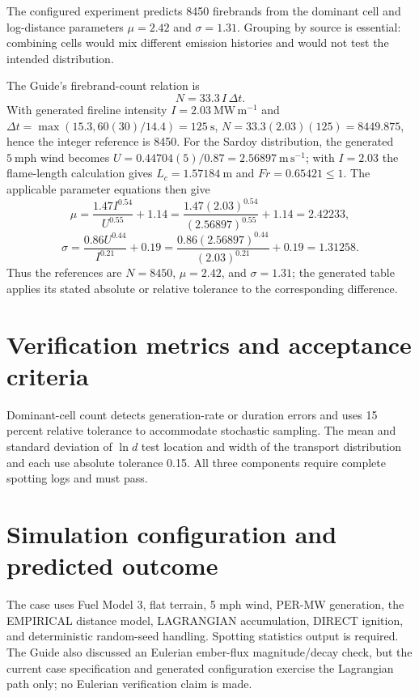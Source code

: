 The configured experiment predicts 8450 firebrands from the dominant cell and log-distance parameters \(\mu=2.42\) and \(\sigma=1.31\). Grouping by source is essential: combining cells would mix different emission histories and would not test the intended distribution.

The Guide's firebrand-count relation is
\[
 N=33.3\,I\,\Delta t.
\]
With generated fireline intensity \(I=2.03~\mathrm{MW\,m^{-1}}\) and
\(\Delta t=\max(15.3,60(30)/14.4)=125~\mathrm{s}\),
\(N=33.3(2.03)(125)=8449.875\), hence the integer reference is 8450.
For the Sardoy distribution, the generated \(5~\mathrm{mph}\) wind becomes
\(U=0.44704(5)/0.87=2.56897~\mathrm{m\,s^{-1}}\); with \(I=2.03\) the
flame-length calculation gives \(L_c=1.57184~\mathrm{m}\) and
\(Fr=0.65421\leq1\).  The applicable parameter equations then give
\[
 \mu=\frac{1.47I^{0.54}}{U^{0.55}}+1.14
     =\frac{1.47(2.03)^{0.54}}{(2.56897)^{0.55}}+1.14=2.42233,
\]
\[
 \sigma=\frac{0.86U^{0.44}}{I^{0.21}}+0.19
 =\frac{0.86(2.56897)^{0.44}}{(2.03)^{0.21}}+0.19=1.31258.
\]
Thus the references are \(N=8450\), \(\mu=2.42\), and \(\sigma=1.31\);
the generated table applies its stated absolute or relative tolerance to
the corresponding difference.

\section{Verification metrics and acceptance criteria}

Dominant-cell count detects generation-rate or duration errors and uses 15 percent relative tolerance to accommodate stochastic sampling. The mean and standard deviation of \(\ln d\) test location and width of the transport distribution and each use absolute tolerance 0.15. All three components require complete spotting logs and must pass.

\section{Simulation configuration and predicted outcome}

The case uses Fuel Model 3, flat terrain, 5 mph wind, PER-MW generation, the EMPIRICAL distance model, LAGRANGIAN accumulation, DIRECT ignition, and deterministic random-seed handling. Spotting statistics output is required. The Guide also discussed an Eulerian ember-flux magnitude/decay check, but the current case specification and generated configuration exercise the Lagrangian path only; no Eulerian verification claim is made.

